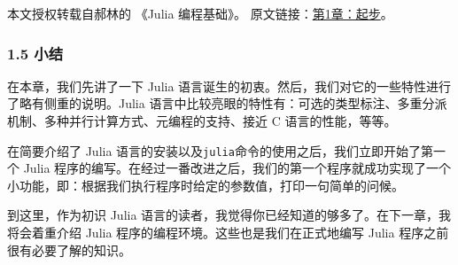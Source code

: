
本文授权转载自郝林的 《Julia 编程基础》。 原文链接：\href{https://github.com/hyper0x/JuliaBasics/blob/master/book/ch01.md}{第1章：起步}。

\subsubsection{1.5 小结}

在本章，我们先讲了一下 Julia 语言诞生的初衷。然后，我们对它的一些特性进行了略有侧重的说明。Julia 语言中比较亮眼的特性有：可选的类型标注、多重分派机制、多种并行计算方式、元编程的支持、接近 C 语言的性能，等等。

在简要介绍了 Julia 语言的安装以及\verb|julia|命令的使用之后，我们立即开始了第一个 Julia 程序的编写。在经过一番改进之后，我们的第一个程序就成功实现了一个小功能，即：根据我们执行程序时给定的参数值，打印一句简单的问候。

到这里，作为初识 Julia 语言的读者，我觉得你已经知道的够多了。在下一章，我将会着重介绍 Julia 程序的编程环境。这些也是我们在正式地编写 Julia 程序之前很有必要了解的知识。
